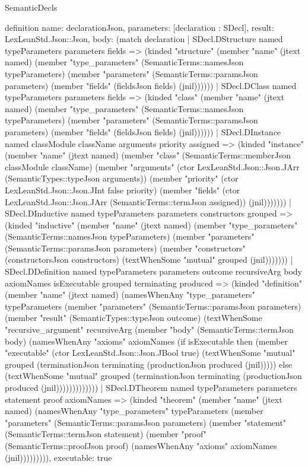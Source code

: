 \begin{lexlean}{SemanticDecls}
\begin{semanticmodule}
definition{
  name: declarationJson,
  parameters: [declaration : SDecl],
  result: LexLeanStd.Json::Json,
  body: (match declaration
    | SDecl.DStructure named typeParameters parameters fields => (kinded "structure" (member "name" (jtext named) (member "type_parameters" (SemanticTerms::namesJson typeParameters) (member "parameters" (SemanticTerms::paramsJson parameters) (member "fields" (fieldsJson fields) (jnil))))))
    | SDecl.DClass named typeParameters parameters fields => (kinded "class" (member "name" (jtext named) (member "type_parameters" (SemanticTerms::namesJson typeParameters) (member "parameters" (SemanticTerms::paramsJson parameters) (member "fields" (fieldsJson fields) (jnil))))))
    | SDecl.DInstance named classModule className arguments priority assigned => (kinded "instance" (member "name" (jtext named) (member "class" (SemanticTerms::memberJson classModule className) (member "arguments" (ctor LexLeanStd.Json::Json.JArr (SemanticTypes::typeJson arguments)) (member "priority" (ctor LexLeanStd.Json::Json.JInt false priority) (member "fields" (ctor LexLeanStd.Json::Json.JArr (SemanticTerms::termJson assigned)) (jnil)))))))
    | SDecl.DInductive named typeParameters parameters constructors grouped => (kinded "inductive" (member "name" (jtext named) (member "type_parameters" (SemanticTerms::namesJson typeParameters) (member "parameters" (SemanticTerms::paramsJson parameters) (member "constructors" (constructorsJson constructors) (textWhenSome "mutual" grouped (jnil)))))))
    | SDecl.DDefinition named typeParameters parameters outcome recursiveArg body axiomNames isExecutable grouped terminating produced => (kinded "definition" (member "name" (jtext named) (namesWhenAny "type_parameters" typeParameters (member "parameters" (SemanticTerms::paramsJson parameters) (member "result" (SemanticTypes::typeJson outcome) (textWhenSome "recursive_argument" recursiveArg (member "body" (SemanticTerms::termJson body) (namesWhenAny "axioms" axiomNames (if isExecutable then (member "executable" (ctor LexLeanStd.Json::Json.JBool true) (textWhenSome "mutual" grouped (terminationJson terminating (productionJson produced (jnil))))) else (textWhenSome "mutual" grouped (terminationJson terminating (productionJson produced (jnil)))))))))))))
    | SDecl.DTheorem named typeParameters parameters statement proof axiomNames => (kinded "theorem" (member "name" (jtext named) (namesWhenAny "type_parameters" typeParameters (member "parameters" (SemanticTerms::paramsJson parameters) (member "statement" (SemanticTerms::termJson statement) (member "proof" (SemanticTerms::proofJson proof) (namesWhenAny "axioms" axiomNames (jnil))))))))),
  executable: true
}


\end{semanticmodule}
\end{lexlean}
